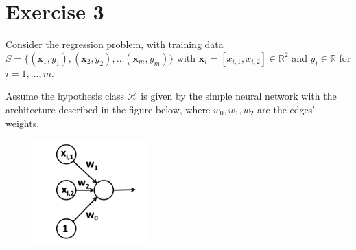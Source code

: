 \documentclass[a4paper,11pt,oneside]{book}
\begin{document}
\section{Exercise 3}
Consider the regression problem, with training data $S = \{(\mathbf{x}_1, y_1), (\mathbf{x}_2, y_2), \ldots (\mathbf{x}_m, y_m)\}$ with $\mathbf{x}_i = [x_{i,1}, x_{i,2}] \in \mathbb{R}^2$ and $y_i \in \mathbb{R}$ for $i = 1,\ldots,m$.

Assume the hypothesis class $\mathcal{H}$ is given by the simple neural network with the architecture described in the figure below, where $w_0, w_1, w_2$ are the edges' weights.

\begin{figure}[H]
    \centering
    \includegraphics[width=0.4\textwidth,height=0.4\textheight,keepaspectratio]{images/3_28_Jan_2021.png}
 \end{figure}
\end{document}
